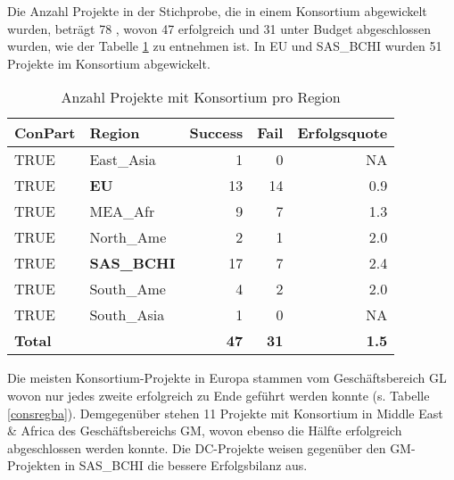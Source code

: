 %
%
Die Anzahl Projekte in der Stichprobe, die in einem Konsortium abgewickelt wurden, beträgt 78 , wovon 47 erfolgreich und 31 unter Budget abgeschlossen wurden, wie der Tabelle \ref{fcons} zu entnehmen ist. In EU und SAS\_BCHI wurden 51 Projekte im Konsortium abgewickelt.
\begin{table}[H]
	\centering
	\caption{Anzahl Projekte mit Konsortium pro Region}
	\begin{tabular}{lrrrr}
		\textbf{ConPart} & \multicolumn{1}{l}{\textbf{Region}} & \multicolumn{1}{l}{\textbf{Success}} & \multicolumn{1}{l}{\textbf{Fail}} & \multicolumn{1}{l}{\textbf{Erfolgsquote}} \\\hline
		TRUE  & \multicolumn{1}{l}{East\_Asia} & 1     & 0     & NA \\
		TRUE  & \multicolumn{1}{l}{\textbf{EU}} & 13    & 14    & 0.9 \\
		TRUE  & \multicolumn{1}{l}{MEA\_Afr} & 9     & 7     & 1.3 \\
		TRUE  & \multicolumn{1}{l}{North\_Ame} & 2     & 1     & 2.0 \\
		TRUE  & \multicolumn{1}{l}{\textbf{SAS\_BCHI}} & 17    & 7     & 2.4 \\
		TRUE  & \multicolumn{1}{l}{South\_Ame} & 4     & 2     & 2.0 \\
		TRUE  & \multicolumn{1}{l}{South\_Asia} & 1     & 0     & NA \\\hline
		\textbf{Total} &       & \textbf{47} & \textbf{31} & \textbf{1.5} \\
	\end{tabular}%
	\label{fcons}%
\end{table}%
Die meisten Konsortium-Projekte in Europa stammen vom Geschäftsbereich GL wovon nur jedes zweite erfolgreich zu Ende geführt werden konnte (s. Tabelle \ref{consregba}). Demgegenüber stehen 11 Projekte mit Konsortium in Middle East \& Africa des Geschäftsbereichs GM, wovon ebenso die Hälfte erfolgreich abgeschlossen werden konnte. Die DC-Projekte weisen gegenüber den GM-Projekten in SAS\_BCHI die bessere Erfolgsbilanz aus.
